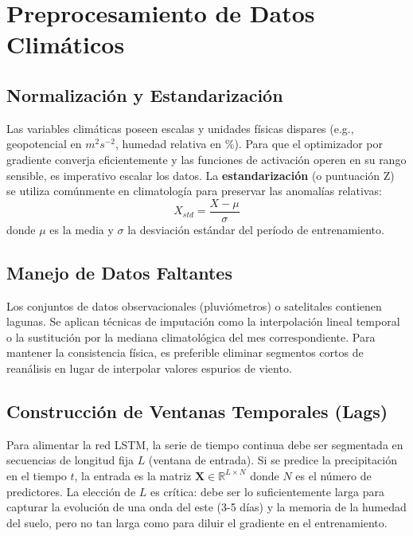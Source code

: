 \documentclass[titlepage,11pt]{report}
\begin{document}
\section{Preprocesamiento de Datos Climáticos}

\subsection{Normalización y Estandarización}
Las variables climáticas poseen escalas y unidades físicas dispares (e.g., geopotencial en \(m^2 s^{-2}\), humedad relativa en \%). Para que el optimizador por gradiente converja eficientemente y las funciones de activación operen en su rango sensible, es imperativo escalar los datos. La \textbf{estandarización} (o puntuación Z) se utiliza comúnmente en climatología para preservar las anomalías relativas:
\begin{equation}
    X_{std} = \frac{X - \mu}{\sigma}
\end{equation}
donde \(\mu\) es la media y \(\sigma\) la desviación estándar del período de entrenamiento.

\subsection{Manejo de Datos Faltantes}
Los conjuntos de datos observacionales (pluviómetros) o satelitales contienen lagunas. Se aplican técnicas de imputación como la interpolación lineal temporal o la sustitución por la mediana climatológica del mes correspondiente. Para mantener la consistencia física, es preferible eliminar segmentos cortos de reanálisis en lugar de interpolar valores espurios de viento.

\subsection{Construcción de Ventanas Temporales (Lags)}
Para alimentar la red LSTM, la serie de tiempo continua debe ser segmentada en secuencias de longitud fija \(L\) (ventana de entrada). Si se predice la precipitación en el tiempo \(t\), la entrada es la matriz \(\mathbf{X} \in \mathbb{R}^{L \times N}\) donde \(N\) es el número de predictores. La elección de \(L\) es crítica: debe ser lo suficientemente larga para capturar la evolución de una onda del este (3-5 días) y la memoria de la humedad del suelo, pero no tan larga como para diluir el gradiente en el entrenamiento.
\end{document}
